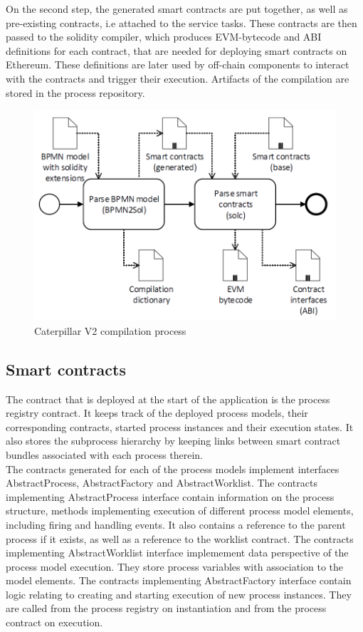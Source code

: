 On the second step, the generated smart contracts are put together, as well as pre-existing contracts, i.e attached to the service tasks. These contracts are then passed to the solidity compiler, which produces EVM-bytecode and ABI definitions for each contract, that are needed for deploying smart contracts on Ethereum. These definitions are later used by off-chain components to interact with the contracts and trigger their execution. Artifacts of the compilation are stored in the process repository.

\begin{figure}[hbt]
	\includegraphics[width=\textwidth]{gfx/caterpillar-compilation-process}
	\caption{Caterpillar V2 compilation process}
	\label{fig:caterpillar:v2:compilation}
\end{figure}

\subsection{Smart contracts}
The contract that is deployed at the start of the application is the process registry contract. It keeps track of the deployed process models, their corresponding contracts, started process instances and their execution states. It also stores the subprocess hierarchy by keeping links between smart contract bundles associated with each process therein.\\

The contracts generated for each of the process models implement interfaces AbstractProcess, AbstractFactory and AbstractWorklist. The contracts implementing AbstractProcess interface contain information on the process structure, methods implementing execution of different process model elements, including firing and handling events. It also contains a reference to the parent process if it exists, as well as a reference to the worklist contract. The contracts implementing AbstractWorklist interface implemement data perspective of the process model execution. They store process variables with association to the model elements.
The contracts implementing AbstractFactory interface contain logic relating to creating and starting execution of new process instances. They are called from the process registry on instantiation and from the process contract on execution.


